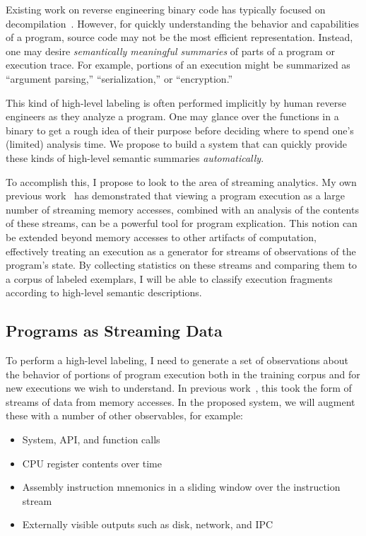 \documentclass{article}
\begin{document}
Existing work on reverse engineering binary code has typically focused
on decompilation~\cite{schwartz:2013:decomp,cifuentes:1995:decomp}.
However, for quickly understanding the behavior and capabilities of a
program, source code may not be the most efficient representation.
Instead, one may desire \emph{semantically meaningful summaries} of
parts of a program or execution trace. For example, portions of an
execution might be summarized as ``argument parsing,''
``serialization,'' or ``encryption.''

This kind of high-level labeling is often performed implicitly by human
reverse engineers as they analyze a program. One may glance over the
functions in a binary to get a rough idea of their purpose before
deciding where to spend one's (limited) analysis time. We propose to
build a system that can quickly provide these kinds of high-level
semantic summaries \emph{automatically}.

To accomplish this, I propose to look to the area of streaming
analytics. My own previous work~\cite{dolangavitt:2013:tzb} has
demonstrated that viewing a program execution as a large number of
streaming memory accesses, combined with an analysis of the contents of
these streams, can be a powerful tool for program explication. This
notion can be extended beyond memory accesses to other artifacts of
computation, effectively treating an execution as a generator for
streams of observations of the program's state. By collecting statistics
on these streams and comparing them to a corpus of labeled exemplars, I 
will be able to classify execution fragments according to high-level
semantic descriptions.

\subsection{Programs as Streaming Data}

To perform a high-level labeling, I need to generate a set of
observations about the behavior of portions of program execution both in
the training corpus and for new executions we wish to understand. In
previous work~\cite{dolangavitt:2013:tzb}, this took the form of streams
of data from memory accesses. In the proposed system, we will augment
these with a number of other observables, for example:

\begin{itemize}
    \item System, API, and function calls
    \item CPU register contents over time
    \item Assembly instruction mnemonics in a sliding window over the
    instruction stream
    \item Externally visible outputs such as disk, network, and IPC
\end{itemize}
\end{document}
